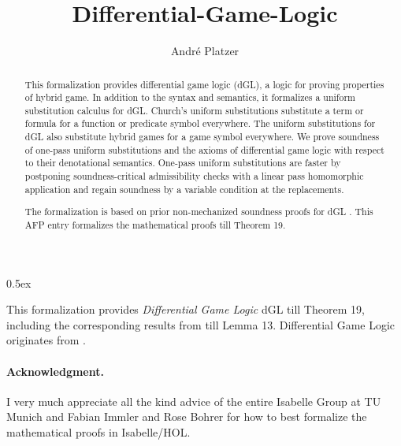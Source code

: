 \documentclass[11pt,a4paper]{article}
\begin{document}
\title{Differential-Game-Logic}
\author{Andr\'e Platzer}
\maketitle

\begin{abstract}
This formalization provides differential game logic (\textsf{dGL}), a logic for proving properties of hybrid game. In addition to the syntax and semantics, it formalizes a uniform substitution calculus for \textsf{dGL}. Church's uniform substitutions substitute a term or formula for a function or predicate symbol everywhere. The uniform substitutions for \textsf{dGL} also substitute hybrid games for a game symbol everywhere. We prove soundness of one-pass uniform substitutions and the axioms of differential game logic with respect to their denotational semantics. One-pass uniform substitutions are faster by postponing soundness-critical admissibility checks with a linear pass homomorphic application and regain soundness by a variable condition at the replacements.

The formalization is based on prior non-mechanized soundness proofs for \textsf{dGL} \cite{DBLP:journals/tocl/Platzer15,DBLP:conf/cade/Platzer18,DBLP:conf/cade/Platzer19,DBLP:journals/tocl/Platzer15,DBLP:journals/corr/Platzer18:usubst}. This AFP entry formalizes the mathematical proofs \cite{DBLP:conf/cade/Platzer19,DBLP:journals/corr/abs-1902-07230} till Theorem 19.
\end{abstract}

\tableofcontents
\newpage

\parindent 0pt\parskip 0.5ex

This formalization provides \emph{Differential Game Logic} \textsf{dGL} \cite{DBLP:journals/corr/abs-1902-07230,DBLP:conf/cade/Platzer19} till Theorem 19,
including the corresponding results from  \cite{DBLP:conf/cade/Platzer18} till Lemma 13.
Differential Game Logic originates from \cite{DBLP:journals/tocl/Platzer15}.\\[1em]




\paragraph{Acknowledgment.}
I very much appreciate all the kind advice of the entire Isabelle Group at TU Munich and Fabian Immler and Rose Bohrer for how to best formalize the mathematical proofs in Isabelle/HOL.



\end{document}
